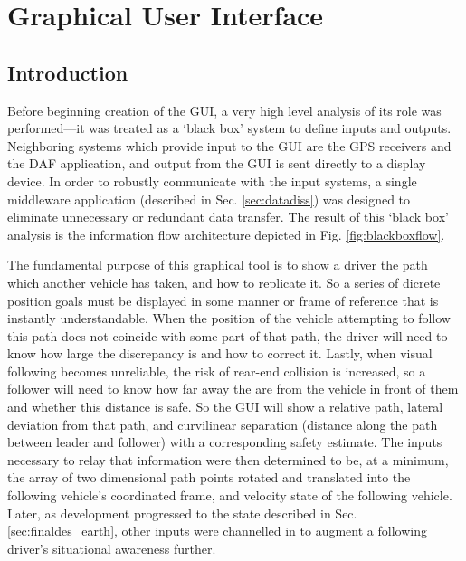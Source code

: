 \chapter{Graphical User Interface} \label{chap:gui}

\section{Introduction} \label{sec:guiintro}

Before beginning creation of the GUI, a very high level analysis of its role was performed---it was treated as a `black box' system to define inputs and outputs. Neighboring systems which provide input to the GUI are the GPS receivers and the DAF application, and output from the GUI is sent directly to a display device. In order to robustly communicate with the input systems, a single middleware application (described in Sec. \ref{sec:datadiss}) was designed to eliminate unnecessary or redundant data transfer. The result of this `black box' analysis is the information flow architecture depicted in Fig. \ref{fig:blackboxflow}.

The fundamental purpose of this graphical tool is to show a driver the path which another vehicle has taken, and how to replicate it. So a series of dicrete position goals must be displayed in some manner or frame of reference that is instantly understandable. When the position of the vehicle attempting to follow this path does not coincide with some part of that path, the driver will need to know how large the discrepancy is and how to correct it. Lastly, when visual following becomes unreliable, the risk of rear-end collision is increased, so a follower will need to know how far away the are from the vehicle in front of them and whether this distance is safe. So the GUI will show a relative path, lateral deviation from that path, and curvilinear separation (distance along the path between leader and follower) with a corresponding safety estimate.
The inputs necessary to relay that information were then determined to be, at a minimum, the array of two dimensional path points rotated and translated into the following vehicle's coordinated frame, and velocity state of the following vehicle. Later, as development progressed to the state described in Sec. \ref{sec:finaldes_earth}, other inputs were channelled in to augment a following driver's situational awareness further.

